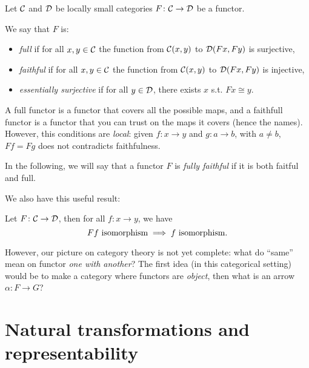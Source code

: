 \documentclass[a4paper]{article}
\theoremstyle { remark }
\theoremstyle { definition }
\newtheorem { definition } { Definition }
\newtheorem { property } { Property }
\theoremstyle { plain }
\begin{document}
\begin{definition}

Let \(  \mathcal { C }  \) and \(  \mathcal { D }  \) be locally small categories \( F \colon  \mathcal { C }  \to  \mathcal { D }  \) be a functor.

We say that \( F \) is:
\begin{itemize}
\item \emph{full} if for all \( x, y \in  \mathcal { C }  \) the function from \(  \mathcal { C } (x, y) \) to \(  \mathcal { D } (F x, F y) \) is surjective,
\item \emph{faithful} if for all \( x, y \in  \mathcal { C }  \) the function from \(  \mathcal { C } (x, y) \) to \(  \mathcal { D } (F x, F y) \) is injective,
\item \emph{essentially surjective} if for all \( y \in  \mathcal { D }  \), there exists \( x \) s.t. \( F x \cong y \).
\end{itemize}

A full functor is a functor that covers all the possible maps, and a faithfull functor is a functor that you can trust on the maps it covers (hence the names).
However, this conditions are \emph{local}: given \( f \colon x \to y \) and \( g \colon a \to b \), with \( a \neq b \), \( F f = F g \) does not contradicts faithfulness.

In the following, we will say that a functor \( F \) is \emph{fully faithful} if it is both faitful and full.

\end{definition}

We also have this useful result:

\begin{property}
Let \( F \colon  \mathcal { C }  \to  \mathcal { D }  \), then for all \( f \colon x \to y \), we have
\[
  \text{\( F f \) isomorphism} \implies \text{\( f \) isomorphism}.
\]
\end{property}

However, our picture on category theory is not yet complete: what do \enquote{same} mean on functor \emph{one with another}?
The first idea (in this categorical setting) would be to make a category where functors are \emph{object}, then what is an arrow \( \alpha \colon F \to G \)?

\section{Natural transformations and representability}
\end{document}
